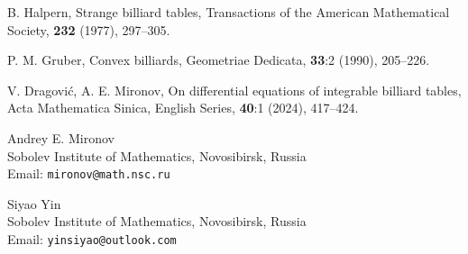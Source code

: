 \documentclass[12pt]{article}
\begin{document}
\begin{thebibliography}{1}
B. Halpern, Strange billiard tables, 
Transactions of the American Mathematical Society, {\bf 232} (1977), 297--305.

P. M. Gruber, Convex billiards, 
Geometriae Dedicata, {\bf 33}:2 (1990), 205--226.


V. Dragovi\'c, A. E. Mironov, On differential equations of integrable billiard tables, 
Acta Mathematica Sinica, English Series, {\bf 40}:1 (2024), 417--424.	


\end{thebibliography}
	
	
\vspace{2cm}

\noindent
{Andrey E. Mironov}\\
Sobolev Institute of Mathematics, Novosibirsk, Russia\\
Email: \texttt{mironov@math.nsc.ru}

\medskip
\noindent
{Siyao Yin}\\
Sobolev Institute of Mathematics, Novosibirsk, Russia\\
Email: \texttt{yinsiyao@outlook.com}
\end{document}
